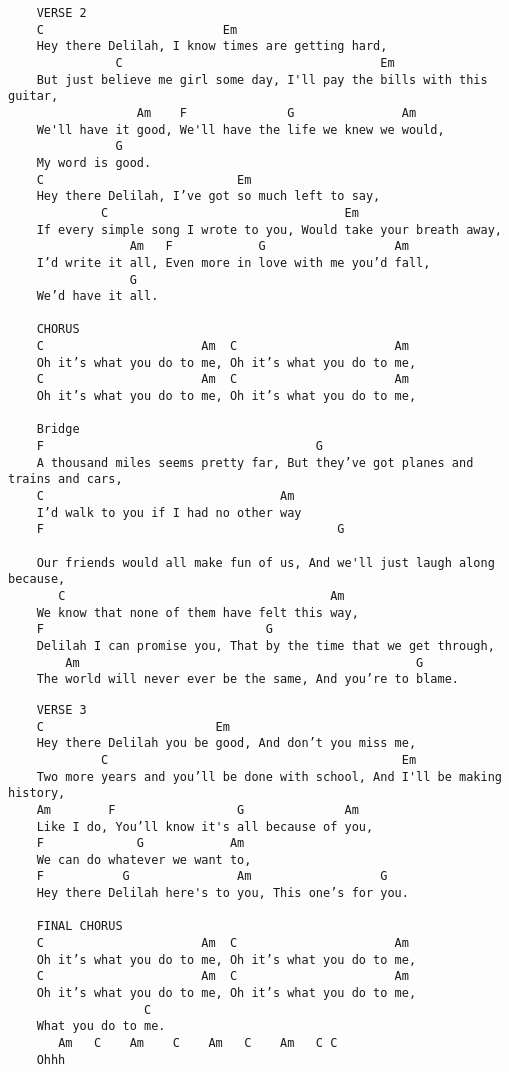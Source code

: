\documentclass[leqno]{memoir}
\begin{document}
\begin{verbatim}
    VERSE 2
    C                         Em 
    Hey there Delilah, I know times are getting hard,
               C                                    Em 
    But just believe me girl some day, I'll pay the bills with this guitar,
                  Am    F              G               Am 
    We'll have it good, We'll have the life we knew we would,
               G 
    My word is good.
    C                           Em   
    Hey there Delilah, I’ve got so much left to say,
             C                                 Em 
    If every simple song I wrote to you, Would take your breath away,
                 Am   F            G                  Am 
    I’d write it all, Even more in love with me you’d fall,
                 G 
    We’d have it all.
    
    CHORUS
    C                      Am  C                      Am 
    Oh it’s what you do to me, Oh it’s what you do to me,
    C                      Am  C                      Am           
    Oh it’s what you do to me, Oh it’s what you do to me,
    
    Bridge
    F                                      G 
    A thousand miles seems pretty far, But they’ve got planes and trains and cars,
    C                                 Am 
    I’d walk to you if I had no other way
    F                                         G 

    Our friends would all make fun of us, And we'll just laugh along because,
       C                                     Am 
    We know that none of them have felt this way,
    F                               G           
    Delilah I can promise you, That by the time that we get through,
        Am                                               G 
    The world will never ever be the same, And you’re to blame.
\end{verbatim}
\newpage
\begin{verbatim}
    VERSE 3
    C                        Em 
    Hey there Delilah you be good, And don’t you miss me,
             C                                         Em 
    Two more years and you’ll be done with school, And I'll be making history,
    Am        F                 G              Am 
    Like I do, You’ll know it's all because of you,
    F             G            Am 
    We can do whatever we want to,
    F           G               Am                  G 
    Hey there Delilah here's to you, This one’s for you.
    
    FINAL CHORUS
    C                      Am  C                      Am 
    Oh it’s what you do to me, Oh it’s what you do to me,
    C                      Am  C                      Am 
    Oh it’s what you do to me, Oh it’s what you do to me,
                   C 
    What you do to me.
       Am   C    Am    C    Am   C    Am   C C 
    Ohhh


\end{verbatim}
\newpage
\end{document}
